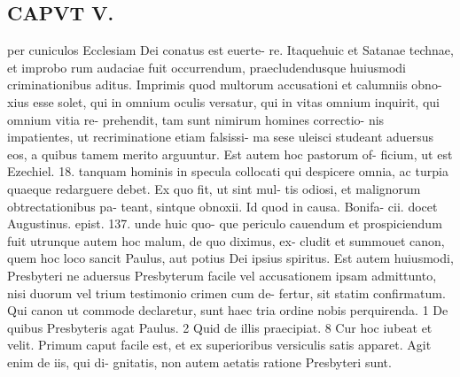 \documentclass{article}
\begin{document}
\begin{pages}
\section*{CAPVT  V. }
\marginpar{[ p.33 ]}per cuniculos Ecclesiam Dei conatus est euerte- re. Itaquehuic et Satanae technae, et improbo rum audaciae fuit occurrendum, praecludendusque huiusmodi criminationibus aditus. Imprimis quod multorum accusationi et calumniis obno- xius esse solet, qui in omnium oculis versatur, qui in vitas omnium inquirit, qui omnium vitia re- prehendit, tam sunt nimirum homines correctio- nis impatientes, ut recriminatione etiam falsissi- ma sese uleisci studeant aduersus eos, a quibus tamem merito arguuntur. Est autem hoc pastorum of- ficium, ut est Ezechiel. 18. tanquam hominis in specula collocati qui despicere omnia, ac turpia quaeque redarguere debet. Ex quo fit, ut sint mul- tis odiosi, et malignorum obtrectationibus pa- teant, sintque obnoxii. Id quod in causa. Bonifa- cii. docet Augustinus. epist. 137. unde huic quo- que periculo cauendum et prospiciendum fuit utrunque autem hoc malum, de quo diximus, ex- cludit et summouet canon, quem hoc loco sancit Paulus, aut potius Dei ipsius spiritus. Est autem huiusmodi, Presbyteri ne aduersus Presbyterum facile vel accusationem ipsam admittunto, nisi duorum vel trium testimonio crimen cum de- fertur, sit statim confirmatum. Qui canon ut commode declaretur, sunt haec tria ordine nobis perquirenda. 1 De quibus Presbyteris agat Paulus. 2 Quid de illis praecipiat. 8 Cur hoc iubeat et velit. Primum caput facile est, et ex superioribus versiculis satis apparet. Agit enim de iis, qui di- gnitatis, non autem aetatis ratione Presbyteri sunt. 

\end{pages}
\end{document}
